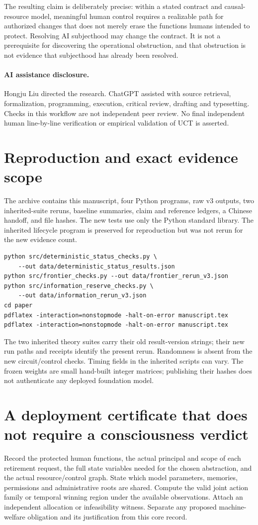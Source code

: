 The resulting claim is deliberately precise: within a stated contract and causal-resource model, meaningful human control requires a realizable path for authorized changes that does not merely erase the functions humans intended to protect. Resolving AI subjecthood may change the contract. It is not a prerequisite for discovering the operational obstruction, and that obstruction is not evidence that subjecthood has already been resolved.

\paragraph{AI assistance disclosure.}
Hongju Liu directed the research. ChatGPT assisted with source retrieval, formalization, programming, execution, critical review, drafting and typesetting. Checks in this workflow are not independent peer review. No final independent human line-by-line verification or empirical validation of UCT is asserted.

\appendix
\section{Reproduction and exact evidence scope}
The archive contains this manuscript, four Python programs, raw v3 outputs, two inherited-suite reruns, baseline summaries, claim and reference ledgers, a Chinese handoff, and file hashes. The new tests use only the Python standard library. The inherited lifecycle program is preserved for reproduction but was not rerun for the new evidence count.
\begin{lstlisting}
python src/deterministic_status_checks.py \
    --out data/deterministic_status_results.json
python src/frontier_checks.py --out data/frontier_rerun_v3.json
python src/information_reserve_checks.py \
    --out data/information_rerun_v3.json
cd paper
pdflatex -interaction=nonstopmode -halt-on-error manuscript.tex
pdflatex -interaction=nonstopmode -halt-on-error manuscript.tex
\end{lstlisting}
The two inherited theory suites carry their old result-version strings; their new run paths and receipts identify the present rerun. Randomness is absent from the new circuit/control checks. Timing fields in the inherited scripts can vary. The frozen weights are small hand-built integer matrices; publishing their hashes does not authenticate any deployed foundation model.

\section{A deployment certificate that does not require a consciousness verdict}
Record the protected human functions, the actual principal and scope of each retirement request, the full state variables needed for the chosen abstraction, and the actual resource/control graph. State which model parameters, memories, permissions and administrative roots are shared. Compute the valid joint action family or temporal winning region under the available observations. Attach an independent allocation or infeasibility witness. Separate any proposed machine-welfare obligation and its justification from this core record.

